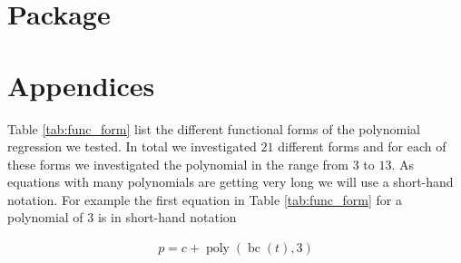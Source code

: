 \documentclass[12pt,a4paper]{article}
\DeclareMathOperator{\bc}{bc}
\DeclareMathOperator{\poly}{poly}
\begin{document}
\hypertarget{package}{%
\section{Package}\label{package}}

\pagebreak

\setcounter{page}{3}
\printbibliography[title = References]
\cleardoublepage

\begin{refsection}
\nocite{R-base}
\nocite{R-stargazer}
\nocite{R-stringr}
\nocite{R-tidyr}
\nocite{R-dplyr}
\nocite{R-glmnet}
\nocite{R-class}
\nocite{R-MASS}
\nocite{R-plm}
\nocite{R-leaps}
\nocite{R-caret}
\nocite{R-tree}
\nocite{R-gbm}
\nocite{R-plotmo}
\nocite{R-pls}
\nocite{R-splines}
\nocite{R-tictoc}
\nocite{R-plotly}
\nocite{R-inspectdf}
\nocite{R-rpart}
\nocite{R-rpart.plot}
\nocite{R-stargazer}
\nocite{R-knitr}
\nocite{R-purrr}
\nocite{R-randomForest}
\nocite{R-rstudioapi}





\nocite{R-Studio}

\printbibliography[title = Software-References]
\end{refsection}

\cleardoublepage
\appendix
\setcounter{table}{0}
\setcounter{figure}{0}
\renewcommand{\thetable}{A\arabic{table}}
\renewcommand{\thefigure}{A\arabic{figure}}


\hypertarget{appendices}{%
\section{Appendices}\label{appendices}}

Table \ref{tab:func_form} list the different functional forms of the
polynomial regression we tested. In total we investigated \(21\)
different forms and for each of these forms we investigated the
polynomial in the range from \(3\) to \(13\). As equations with many
polynomials are getting very long we will use a short-hand notation. For
example the first equation in Table \ref{tab:func_form} for a polynomial
of \(3\) is in short-hand notation

\begin{align}
    p = c + \poly\left( \bc(t), 3 \right)
\end{align}
\end{document}
